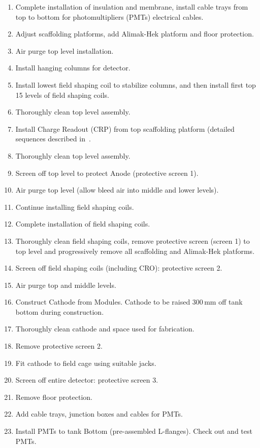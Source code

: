 \begin{enumerate}
\item{Complete installation of insulation and membrane, install cable trays from top to bottom for photomultipliers (PMTs) electrical cables.}
\item{Adjust scaffolding platforms, add Alimak-Hek platform and floor protection.}
\item{Air purge top level installation.}
\item{Install hanging columns for detector.}
\item{Install lowest field shaping coil to stabilize columns, and then install first top 15 levels of field shaping coils.}
\item{Thoroughly clean top level assembly.}
\item{Install Charge Readout (CRP) from top scaffolding platform (detailed sequences described in~\cite{cdr-annex-lbno-2}.}
\item{Thoroughly clean top level assembly.}
\item{Screen off top level to protect Anode (protective screen 1).}
\item{Air purge top level (allow bleed air into middle and lower levels).}
\item{Continue installing field shaping coils.}
\item{Complete installation of field shaping coils.}
\item{Thoroughly clean field shaping coils, remove protective screen (screen 1) to top level and progressively remove all scaffolding and Alimak-Hek platforms.}
\item{Screen off field shaping coils (including CRO): protective screen 2.}
\item{Air purge top and middle levels.}
\item{Construct Cathode from Modules. Cathode to be raised 300\,mm off tank bottom during construction.}
\item{Thoroughly clean cathode and space used for fabrication.}
\item{Remove protective screen 2.}
\item{Fit cathode to field cage using suitable jacks.}
\item{Screen off entire detector: protective screen 3.}
\item{Remove floor protection.}
\item{Add cable trays, junction boxes and cables for PMTs.}
\item{Install PMTs to tank Bottom (pre-assembled L-flanges). Check out and test PMTs.}

\end{enumerate}
